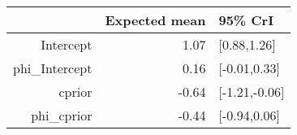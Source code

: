 \begin{tabular}{rrl}
  \hline
 & Expected mean & 95\% CrI \\ 
  \hline
Intercept & 1.07 & [0.88,1.26] \\ 
  phi\_Intercept & 0.16 & [-0.01,0.33] \\ 
  cprior & -0.64 & [-1.21,-0.06] \\ 
  phi\_cprior & -0.44 & [-0.94,0.06] \\ 
   \hline
\end{tabular}

